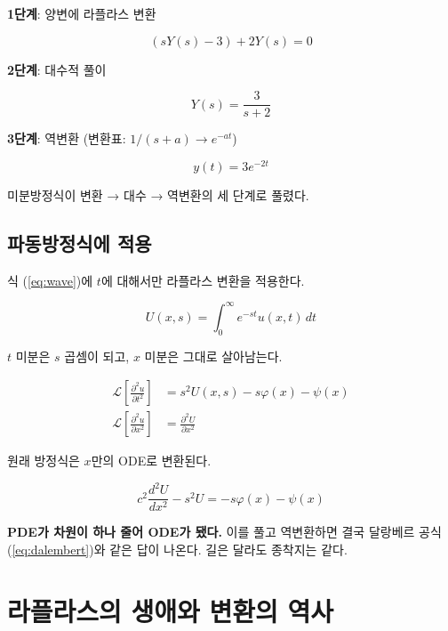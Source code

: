 \documentclass[11pt,a4paper]{article}
\begin{document}
\textbf{1단계}: 양변에 라플라스 변환

\begin{equation}
(sY(s) - 3) + 2Y(s) = 0
\end{equation}

\textbf{2단계}: 대수적 풀이

\begin{equation}
Y(s) = \frac{3}{s+2}
\end{equation}

\textbf{3단계}: 역변환 (변환표: $1/(s+a) \to e^{-at}$)

\begin{equation}
y(t) = 3e^{-2t}
\end{equation}

미분방정식이 변환 → 대수 → 역변환의 세 단계로 풀렸다.

\subsection{파동방정식에 적용}

식 (\ref{eq:wave})에 $t$에 대해서만 라플라스 변환을 적용한다.

\begin{equation}
U(x, s) = \int_0^\infty e^{-st} u(x, t)\, dt
\end{equation}

$t$ 미분은 $s$ 곱셈이 되고, $x$ 미분은 그대로 살아남는다.

\begin{align}
\mathcal{L}\!\left[\frac{\partial^2 u}{\partial t^2}\right] &= s^2 U(x, s) - s\varphi(x) - \psi(x) \\
\mathcal{L}\!\left[\frac{\partial^2 u}{\partial x^2}\right] &= \frac{\partial^2 U}{\partial x^2}
\end{align}

원래 방정식은 $x$만의 ODE로 변환된다.

\begin{equation}
c^2 \frac{d^2 U}{dx^2} - s^2 U = -s\varphi(x) - \psi(x)
\end{equation}

\textbf{PDE가 차원이 하나 줄어 ODE가 됐다.} 이를 풀고 역변환하면 결국 달랑베르 공식 (\ref{eq:dalembert})와 같은 답이 나온다. 길은 달라도 종착지는 같다.

\section{라플라스의 생애와 변환의 역사}
\end{document}
